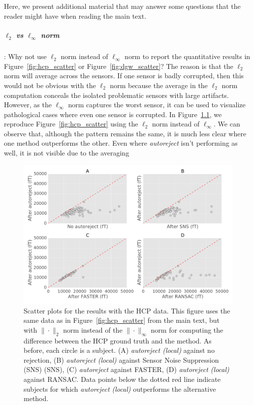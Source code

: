 \begin{appendices}
\chapter{}
\vspace{-20pt}

Here, we present additional material that may answer some questions that the reader might have when reading the main text.

\paragraph{$\ell_{2}$ vs $\ell_{\infty}$ norm}: Why not use $\ell_{2}$ norm instead of $\ell_{\infty}$ norm to report the quantitative results in Figure~\ref{fig:hcp_scatter} or Figure~\ref{fig:dgw_scatter}? The reason is that the $\ell_{2}$ norm will average across the sensors. If one sensor is badly corrupted, then this would not be obvious with the $\ell_{2}$ norm because the average in the $\ell_{2}$ norm computation conceals the isolated problematic sensors with large artifacts. However, as the $\ell_\infty$ norm captures the worst sensor, it can be used to visualize pathological cases where even one sensor is corrupted. In Figure~\ref{fig:l2_norm}, we reproduce Figure~\ref{fig:hcp_scatter} using the $\ell_2$ norm instead of $\ell_{\infty}$. We can observe that, although the pattern remains the same, it is much less clear where one method outperforms the other. Even where \emph{autoreject} isn't performing as well, it is not  visible due to the averaging %

\begin{figure}[htb]
	\centering
	\includegraphics[width=0.8\linewidth]{figures/figure4_supp.pdf}
    \caption{Scatter plots for the results with the HCP data. This figure uses the same data as in Figure~\ref{fig:hcp_scatter} from the main text, but with  $\|\cdot\|_2$ norm instead of the $\|\cdot\|_\infty$ norm for computing the difference between the HCP ground truth and the method. As before, each circle is a subject. (A) \textit{autoreject (local)} against no rejection, (B) \textit{autoreject (local)} against Sensor Noise Suppression (SNS) (SNS), (C) \textit{autoreject} against FASTER, (D) \textit{autoreject (local)} against RANSAC. Data points below the dotted red line indicate subjects for which \textit{autoreject (local)} outperforms the alternative method.}
    \label{fig:l2_norm}
\end{figure}


\end{appendices}

